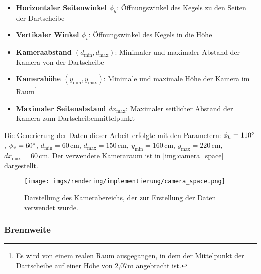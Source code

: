 \begin{itemize}
    \item \textbf{Horizontaler Seitenwinkel $\phi_h$}: Öffnungswinkel des Kegels zu den Seiten der Dartscheibe
    \item \textbf{Vertikaler Winkel $\phi_v$}: Öffnungswinkel des Kegels in die Höhe
    \item \textbf{Kameraabstand $\left(d_\text{min}, d_\text{max}\right)$}: Minimaler und maximaler Abstand der Kamera von der Dartscheibe
    \item \textbf{Kamerahöhe $\left(y_\text{min}, y_\text{max}\right)$}: Minimale und maximale Höhe der Kamera im Raum\footnote{Es wird von einem realen Raum ausgegangen, in dem der Mittelpunkt der Dartscheibe auf einer Höhe von 2,07m angebracht ist.}
    \item \textbf{Maximaler Seitenabstand $dx_\text{max}$}: Maximaler seitlicher Abstand der Kamera zum Dartscheibenmittelpunkt
\end{itemize}


Die Generierung der Daten dieser Arbeit erfolgte mit den Parametern: $\phi_h = 110^{\circ}$, $\phi_v = 60^{\circ}$, $d_\text{min} = 60\,\text{cm}$, $d_\text{max} = 150\,\text{cm}$, $y_\text{min} = 160\,\text{cm}$, $y_\text{max} = 220\,\text{cm}$, $dx_\text{max} = 60\,\text{cm}$. Der verwendete Kameraraum ist in \autoref{img:camera_space} dargestellt.

\begin{figure}
    \centering
    \texttt{[image: imgs/rendering/implementierung/camera\_space.png]}
    \caption{Darstellung des Kamerabereichs, der zur Erstellung der Daten verwendet wurde.}
    \label{img:camera_space}
\end{figure}

\subsubsection{Brennweite}

